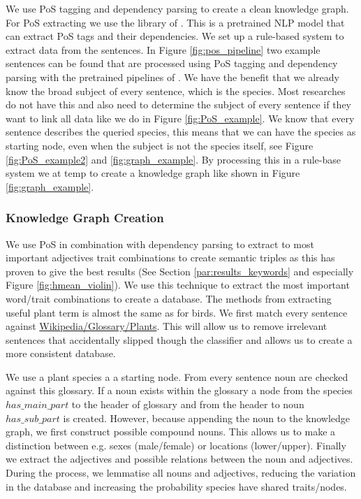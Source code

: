 \documentclass[a4paper, 12pt, oneside]{book} %
\begin{document}
We use PoS tagging and dependency parsing to create a clean knowledge graph.
For PoS extracting we use the library of \textcite{honnibal_spacy_2020}.
This is a pretrained NLP model that can extract PoS tags and their dependencies.
We set up a rule-based system to extract data from the sentences.
In Figure \ref{fig:pos_pipeline} two example sentences can be found that are processed using PoS tagging and dependency parsing with the pretrained pipelines of \textcite{honnibal_spacy_2020}.
We have the benefit that we already know the broad subject of every sentence, which is the species.
Most researches do not have this and also need to determine the subject of every sentence if they want to link all data \autocite{hutchison_knowledge_2013} like we do in Figure \ref{fig:PoS_example}.
We know that every sentence describes the queried species, this means that we can have the species as starting node, even when the subject is not the species itself, see Figure \ref{fig:PoS_example2} and \ref{fig:graph_example}.
By processing this in a rule-base system we at temp to create a knowledge graph like shown in Figure \ref{fig:graph_example}.



\subsubsection{Knowledge Graph Creation}
We use PoS in combination with dependency parsing to extract to most important adjectives trait combinations to create semantic triples as this has proven to give the best results (See Section \ref{par:results_keywords} and especially Figure \ref{fig:hmean_violin}).
We use this technique to extract the most important word/trait combinations to create a database.
The methods from extracting useful plant term is almost the same as for birds.
We first match every sentence against \href{https://en.wikipedia.org/wiki/Glossary_of_plant_morphology}{Wikipedia/Glossary/Plants}.
This will allow us to remove irrelevant sentences that accidentally slipped though the classifier and allows us to create a more consistent database.

We use a plant species a a starting node.
From every sentence noun are checked against this glossary.
If a noun exists within the glossary a node from the species $has\_main\_part$ to the header of glossary and from the header to noun $has\_sub\_part$ is created.
However, because appending the noun to the knowledge graph, we first construct possible compound nouns.
This allows us to make a distinction between e.g. sexes (male/female) or locations (lower/upper).
Finally we extract the adjectives and possible relations between the noun and adjectives.
During the process, we lemmatise all nouns and adjectives, reducing the variation in the database and increasing the probability species have shared traits/nodes.
\end{document}
